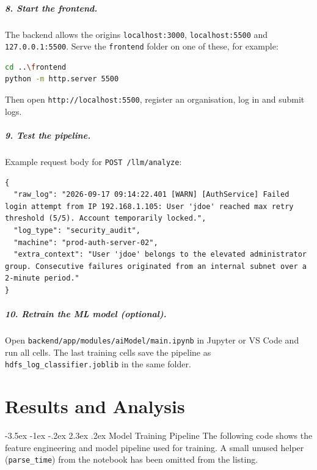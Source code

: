 \documentclass[12pt,a4paper]{report}
\makeatletter
\renewcommand\section{\@startsection {section}{1}{\z@}%
  {-3.5ex \@plus -1ex \@minus -.2ex}%
  {2.3ex \@plus .2ex}%
  {\normalfont\fontsize{17}{21}\selectfont\bfseries}}
\makeatother
\begin{document}
\paragraph{8. Start the frontend.} The backend allows the origins \texttt{localhost:3000}, \texttt{localhost:5500} and \texttt{127.0.0.1:5500}. Serve the \texttt{frontend} folder on one of these, for example:
\begin{lstlisting}[language=bash]
cd ..\frontend
python -m http.server 5500
\end{lstlisting}
Then open \texttt{http://localhost:5500}, register an organisation, log in and submit logs.

\paragraph{9. Test the pipeline.} Example request body for \texttt{POST /llm/analyze}:
\begin{lstlisting}
{
  "raw_log": "2026-09-17 09:14:22.401 [WARN] [AuthService] Failed login attempt from IP 192.168.1.105: User 'jdoe' reached max retry threshold (5/5). Account temporarily locked.",
  "log_type": "security_audit",
  "machine": "prod-auth-server-02",
  "extra_context": "User 'jdoe' belongs to the elevated administrator group. Consecutive failures originated from an internal subnet over a 2-minute period."
}
\end{lstlisting}

\paragraph{10. Retrain the ML model (optional).} Open \texttt{backend/app/modules/aiModel/main.ipynb} in Jupyter or VS Code and run all cells. The last training cells save the pipeline as \texttt{hdfs\_log\_classifier.joblib} in the same folder.

\chapter{Results and Analysis}
\section{Model Training Pipeline}
The following code shows the feature engineering and model pipeline used for training. A small unused helper (\texttt{parse\_time}) from the notebook has been omitted from the listing.
\end{document}
